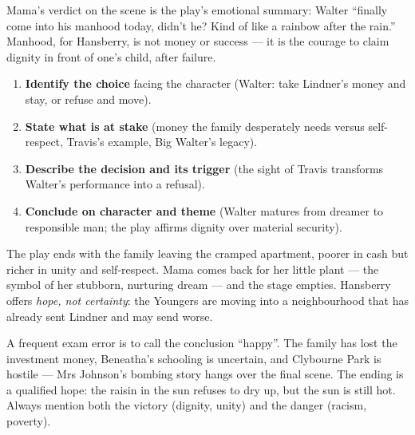 \documentclass[11pt]{article}
\newcommand{\cle}[1]{{\popxbold\color{popdark}#1}}
\newcounter{popsec}
\newcounter{popsub}
\newcommand{\courssub}[1]{%
  \stepcounter{popsub}%
  \par\vspace{9pt}\noindent{\popxbold\fontsize{11.5}{13}\selectfont\color{popink}{\color{poporange}\thepopsec.\thepopsub}\hspace{6pt}#1}\par\nopagebreak\vspace{4pt}
}
\begin{document}
\begin{aretenir}
Mama's verdict on the scene is the play's emotional summary: Walter ``finally come into his manhood today, didn't he? Kind of like a rainbow after the rain.'' Manhood, for Hansberry, is not money or success — it is the courage to claim dignity in front of one's child, after failure.
\end{aretenir}

\begin{methode}
\begin{enumerate}
\item \textbf{Identify the choice} facing the character (Walter: take Lindner's money and stay, or refuse and move).
\item \textbf{State what is at stake} (money the family desperately needs versus self-respect, Travis's example, Big Walter's legacy).
\item \textbf{Describe the decision and its trigger} (the sight of Travis transforms Walter's performance into a refusal).
\item \textbf{Conclude on character and theme} (Walter matures from dreamer to responsible man; the play affirms dignity over material security).
\end{enumerate}
\end{methode}

\courssub{Resolution: A Qualified Hope}

The play ends with the family leaving the cramped apartment, poorer in cash but richer in unity and self-respect. Mama comes back for her little plant — the symbol of her stubborn, nurturing dream — and the stage empties. Hansberry offers \emph{hope, not certainty}: the Youngers are moving into a neighbourhood that has already sent Lindner and may send worse.

\begin{attention}
A frequent exam error is to call the conclusion ``happy''. The family has lost the investment money, Beneatha's schooling is uncertain, and Clybourne Park is hostile — Mrs Johnson's bombing story hangs over the final scene. The ending is a \cle{qualified hope}: the raisin in the sun refuses to dry up, but the sun is still hot. Always mention both the victory (dignity, unity) and the danger (racism, poverty).
\end{attention}
\end{document}
